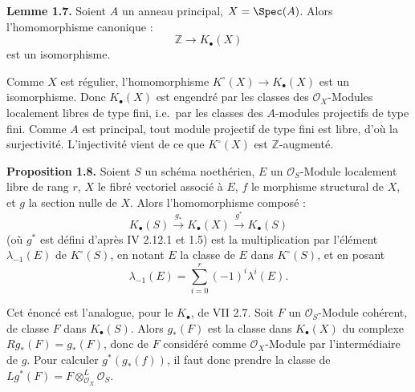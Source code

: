 \textbf{Lemme 1.7.} Soient $A$ un anneau principal, $X=\Spec(A)$. Alors l'homomorphisme canonique :
\[
\mathbb Z\longrightarrow K_\bullet(X)
\]
est un isomorphisme.

Comme $X$ est régulier, l'homomorphisme $K^\circ(X)\to K_\bullet(X)$ est un isomorphisme. Donc $K_\bullet(X)$ est engendré par les classes des $\mathcal O_X$-Modules localement libres de type fini, i.e.\ par les classes des $A$-modules projectifs de type fini. Comme $A$ est principal, tout module projectif de type fini est libre, d'où la surjectivité. L'injectivité vient de ce que $K^\circ(X)$ est $\mathbb Z$-augmenté.

\textbf{Proposition 1.8.} Soient $S$ un schéma noethérien, $E$ un $\mathcal O_S$-Module localement libre de rang $r$, $X$ le fibré vectoriel associé à $E$, $f$ le morphisme structural de $X$, et $g$ la section nulle de $X$. Alors l'homomorphisme composé :
\[
K_\bullet(S)\xrightarrow{g_*}K_\bullet(X)\xrightarrow{g^*}K_\bullet(S)
\]
(où $g^*$ est défini d'après IV 2.12.1 et 1.5) est la multiplication par l'élément $\lambda_{-1}(E)$ de $K^\circ(S)$, en notant $E$ la classe de $E$ dans $K^\circ(S)$, et en posant
\[
\lambda_{-1}(E)=\sum_{i=0}^r(-1)^i\lambda^i(E).
\]

Cet énoncé est l'analogue, pour le $K_\bullet$, de VII 2.7. Soit $F$ un $\mathcal O_S$-Module cohérent, de classe $F$ dans $K_\bullet(S)$. Alors $g_*(F)$ est la classe dans $K_\bullet(X)$ du complexe $Rg_*(F)=g_*(F)$, donc de $F$ considéré comme $\mathcal O_X$-Module par l'intermédiaire de $g$. Pour calculer $g^*(g_*(f))$, il faut donc prendre la classe de \(Lg^*(F)=F\otimes^L_{\mathcal O_X}\mathcal O_S\).

